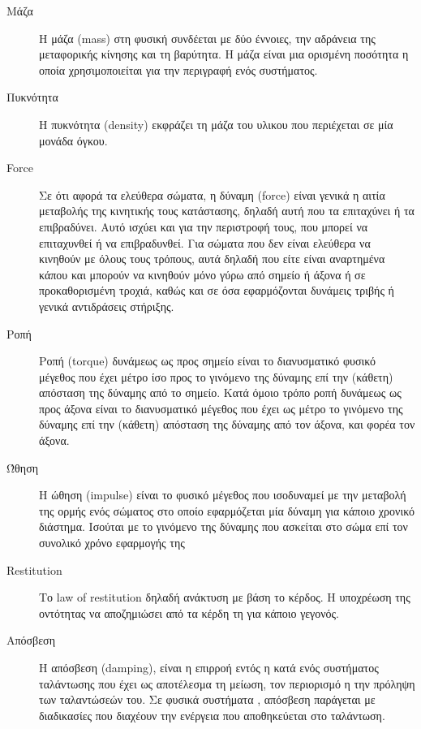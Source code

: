 \begin{description}
\item [Μάζα] Η μάζα (mass) στη φυσική συνδέεται με δύο έννοιες, την αδράνεια της μεταφορικής κίνησης και τη βαρύτητα. Η μάζα είναι μια ορισμένη ποσότητα η οποία χρησιμοποιείται για την περιγραφή ενός συστήματος.

\item [Πυκνότητα]  Η πυκνότητα (density) εκφράζει τη μάζα του υλικου που περιέχεται σε μία μονάδα όγκου. 

\item [Force] Σε ότι αφορά τα ελεύθερα σώματα, η δύναμη (force) είναι γενικά η αιτία μεταβολής της κινητικής τους κατάστασης, δηλαδή αυτή που τα επιταχύνει ή τα επιβραδύνει. Αυτό ισχύει και για την περιστροφή τους, που μπορεί να επιταχυνθεί ή να επιβραδυνθεί. Για σώματα που δεν είναι ελεύθερα να κινηθούν με όλους τους τρόπους, αυτά δηλαδή που είτε είναι αναρτημένα κάπου και μπορούν να κινηθούν μόνο γύρω από σημείο ή άξονα ή σε προκαθορισμένη τροχιά, καθώς και σε όσα εφαρμόζονται δυνάμεις τριβής ή γενικά αντιδράσεις στήριξης.

\item [Ροπή] Ροπή (torque) δυνάμεως ως προς σημείο είναι το διανυσματικό φυσικό μέγεθος που έχει μέτρο ίσο προς το γινόμενο της δύναμης επί την (κάθετη) απόσταση της δύναμης από το σημείο. Κατά όμοιο τρόπο ροπή δυνάμεως ως προς άξονα είναι το διανυσματικό μέγεθος που έχει ως μέτρο το γινόμενο της δύναμης επί την (κάθετη) απόσταση της δύναμης από τον άξονα, και φορέα τον άξονα.

\item [Ώθηση] Η ώθηση (impulse) είναι το φυσικό μέγεθος που ισοδυναμεί με την μεταβολή της ορμής ενός σώματος στο οποίο εφαρμόζεται μία δύναμη για κάποιο χρονικό διάστημα. Ισούται με το γινόμενο της δύναμης που ασκείται στο σώμα επί τον συνολικό χρόνο εφαρμογής της

\item [Restitution] Το law of restitution δηλαδή ανάκτυση με βάση το κέρδος. Η υποχρέωση της οντότητας να αποζημιώσει από τα κέρδη τη για κάποιο γεγονός. 

\item [Απόσβεση] Η απόσβεση (damping), είναι η επιρροή εντός η κατά ενός συστήματος ταλάντωσης που έχει ως αποτέλεσμα τη μείωση, τον περιορισμό η την πρόληψη των ταλαντώσεών του. Σε φυσικά συστήματα , απόσβεση παράγεται με διαδικασίες που διαχέουν την ενέργεια που αποθηκεύεται στο ταλάντωση.
\end{description}

